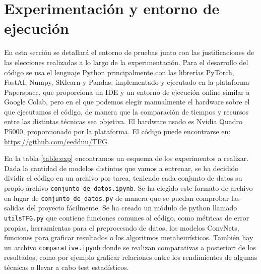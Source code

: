 \section{Experimentación y entorno de ejecución}

En esta sección se detallará el entorno de pruebas junto con las justificaciones de las elecciones realizadas a lo largo de la experimentación. Para el desarrollo del código se usa el lenguaje Python principalmente con las librerías PyTorch, FastAI, Numpy, SKlearn y Pandas; implementado y ejecutado en la plataforma Paperspace, que proporciona un IDE y un entorno de ejecución online similar a Google Colab, pero en el que podemos elegir manualmente el hardware sobre el que ejecutamos el código, de manera que la comparación de tiempos y recursos entre las distintas técnicas sea objetiva. El hardware usado es Nvidia Quadro P5000, proporcionado por la plataforma. El código puede encontrarse en: \url{https://github.com/eedduu/TFG}. 

En la tabla \ref{table:exp} encontramos un esquema de los experimentos a realizar. Dada la cantidad de modelos distintos que vamos a entrenar, se ha decidido dividir el código en un archivo por tarea, teniendo cada conjunto de datos su propio archivo \verb|conjunto_de_datos.ipynb|. Se ha elegido este formato de archivo en lugar de \verb|conjunto_de_datos.py| de manera que se puedan comprobar las salidas del proyecto fácilmente. Se ha creado un módulo de python llamado \verb|utilsTFG.py| que contiene funciones comunes al código, como métricas de error propias, herramientas para el preprocesado de datos, los modelos ConvNets, funciones para graficar resultados o los algoritmos metaheurísticos. También hay un archivo \verb|comparative.ipynb| donde se realizan comparativas a posteriori de los resultados, como por ejemplo graficar relaciones entre los rendimientos de algunas técnicas o llevar a cabo test estadísticos.





